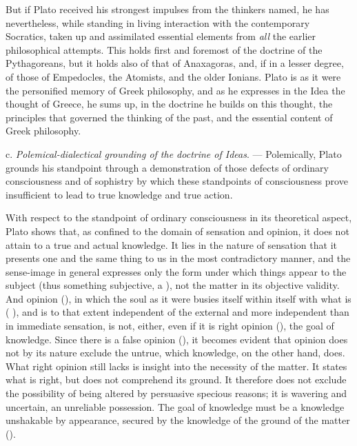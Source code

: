 But if Plato received his strongest impulses from the thinkers named, he
has nevertheless, while standing in living interaction with the
contemporary Socratics, taken up and assimilated essential elements from
\emph{all} the earlier philosophical attempts. This holds first and foremost
of the doctrine of the Pythagoreans, but it holds also of that of
Anaxagoras, and, if in a lesser degree, of those of Empedocles, the
Atomists, and the older Ionians. Plato is as it were the personified memory
of Greek philosophy, and as he expresses in the Idea the thought of Greece,
he sums up, in the doctrine he builds on this thought, the principles that
governed the thinking of the past, and the essential content of Greek
philosophy.

\divrule

c. \emph{Polemical-dialectical grounding of the doctrine of Ideas}. --- Polemically, Plato grounds his standpoint through a demonstration of those defects of ordinary consciousness
and of sophistry by which these standpoints of consciousness
prove insufficient to lead to true knowledge and
true action.

With respect to the standpoint of ordinary consciousness
in its theoretical aspect, Plato shows that, as confined
to the domain of sensation and opinion, it does not attain to a
true and actual knowledge. It lies in the nature of sensation that
it presents one and the same thing to us in the most contradictory manner, and the sense-image in general expresses only
the form under which things appear to the subject (thus
something subjective, a ), not the matter in its objective validity. And opinion (), in which the soul as it were busies itself within
itself with what is (
), and is to that extent independent of the external and more independent than in immediate sensation, is not, either,
even if it is right opinion (), the goal of
knowledge. Since there is a false opinion (), it becomes evident
that opinion does not by its nature exclude the untrue,
which knowledge, on the other hand, does. What right opinion still
lacks is insight into the necessity of the matter. It states what is
right, but does not comprehend its ground. It therefore does not exclude
the possibility of being altered by persuasive specious reasons;
it is wavering and uncertain, an unreliable possession. The goal of knowledge must be a knowledge unshakable by appearance, secured by the knowledge of the ground of the matter ().

